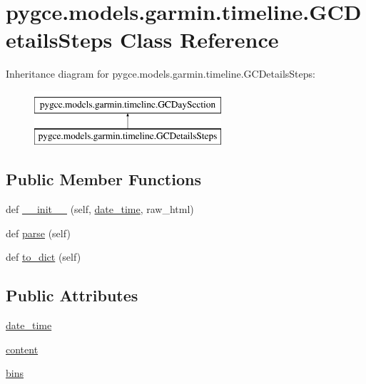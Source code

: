 \hypertarget{classpygce_1_1models_1_1garmin_1_1timeline_1_1_g_c_details_steps}{}\section{pygce.\+models.\+garmin.\+timeline.\+G\+C\+Details\+Steps Class Reference}
\label{classpygce_1_1models_1_1garmin_1_1timeline_1_1_g_c_details_steps}
Inheritance diagram for pygce.\+models.\+garmin.\+timeline.\+G\+C\+Details\+Steps\+:\begin{figure}[H]
\begin{center}
\leavevmode
\includegraphics[height=2.000000cm]{classpygce_1_1models_1_1garmin_1_1timeline_1_1_g_c_details_steps}
\end{center}
\end{figure}
\subsection*{Public Member Functions}
\begin{DoxyCompactItemize}
\item 
def \hyperlink{classpygce_1_1models_1_1garmin_1_1timeline_1_1_g_c_details_steps_a5f7b833bf7f4a81d94f3f133d264824e}{\+\_\+\+\_\+init\+\_\+\+\_\+} (self, \hyperlink{classpygce_1_1models_1_1garmin_1_1timeline_1_1_g_c_details_steps_a0503bcc08719619e9059e254d072b2e9}{date\+\_\+time}, raw\+\_\+html)
\item 
def \hyperlink{classpygce_1_1models_1_1garmin_1_1timeline_1_1_g_c_details_steps_adebc8b1b03fdb864a436e660ee2c198b}{parse} (self)
\item 
def \hyperlink{classpygce_1_1models_1_1garmin_1_1timeline_1_1_g_c_details_steps_a03260c978dfe5aa2d2ddd9643c5a4ecd}{to\+\_\+dict} (self)
\end{DoxyCompactItemize}
\subsection*{Public Attributes}
\begin{DoxyCompactItemize}
\item 
\hyperlink{classpygce_1_1models_1_1garmin_1_1timeline_1_1_g_c_details_steps_a0503bcc08719619e9059e254d072b2e9}{date\+\_\+time}
\item 
\hyperlink{classpygce_1_1models_1_1garmin_1_1timeline_1_1_g_c_details_steps_ab63cc2d91ce9313896d2a6fa80b0bf3a}{content}
\item 
\hyperlink{classpygce_1_1models_1_1garmin_1_1timeline_1_1_g_c_details_steps_a382652a9191f09dce80b307622a879a7}{bins}
\end{DoxyCompactItemize}
